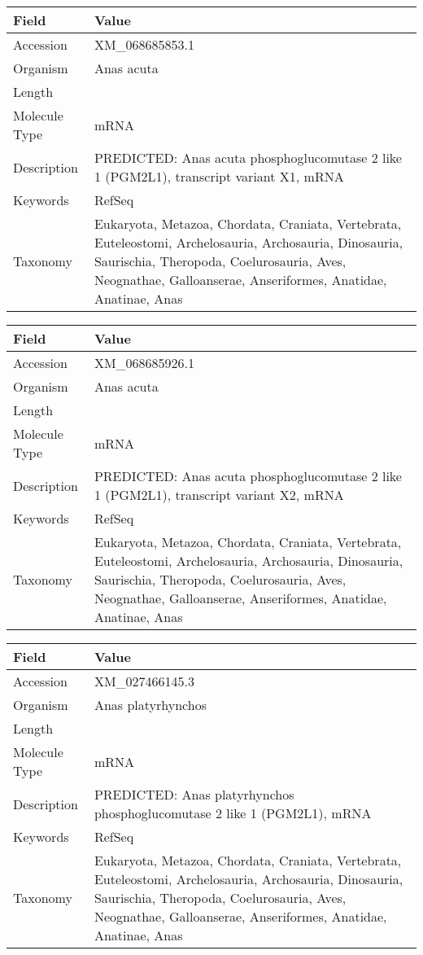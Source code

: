 \documentclass[10pt]{article}
\begin{document}
{\footnotesize
\begin{longtable}{>{\raggedright\arraybackslash}p{4.5cm} >{\raggedright\arraybackslash}p{11.5cm}}
\textbf{Field} & \textbf{Value} \\
\hline
Accession & XM\_068685853.1 \\
Organism & Anas acuta \\
Length & 6369 \\
Molecule Type & mRNA \\
Description & PREDICTED: Anas acuta phosphoglucomutase 2 like 1 (PGM2L1), transcript variant X1, mRNA \\
Keywords & RefSeq \\
Taxonomy & Eukaryota, Metazoa, Chordata, Craniata, Vertebrata, Euteleostomi, Archelosauria, Archosauria, Dinosauria, Saurischia, Theropoda, Coelurosauria, Aves, Neognathae, Galloanserae, Anseriformes, Anatidae, Anatinae, Anas \\
\end{longtable}
}

{\footnotesize
\begin{longtable}{>{\raggedright\arraybackslash}p{4.5cm} >{\raggedright\arraybackslash}p{11.5cm}}
\textbf{Field} & \textbf{Value} \\
\hline
Accession & XM\_068685926.1 \\
Organism & Anas acuta \\
Length & 6180 \\
Molecule Type & mRNA \\
Description & PREDICTED: Anas acuta phosphoglucomutase 2 like 1 (PGM2L1), transcript variant X2, mRNA \\
Keywords & RefSeq \\
Taxonomy & Eukaryota, Metazoa, Chordata, Craniata, Vertebrata, Euteleostomi, Archelosauria, Archosauria, Dinosauria, Saurischia, Theropoda, Coelurosauria, Aves, Neognathae, Galloanserae, Anseriformes, Anatidae, Anatinae, Anas \\
\end{longtable}
}

{\footnotesize
\begin{longtable}{>{\raggedright\arraybackslash}p{4.5cm} >{\raggedright\arraybackslash}p{11.5cm}}
\textbf{Field} & \textbf{Value} \\
\hline
Accession & XM\_027466145.3 \\
Organism & Anas platyrhynchos \\
Length & 6371 \\
Molecule Type & mRNA \\
Description & PREDICTED: Anas platyrhynchos phosphoglucomutase 2 like 1 (PGM2L1), mRNA \\
Keywords & RefSeq \\
Taxonomy & Eukaryota, Metazoa, Chordata, Craniata, Vertebrata, Euteleostomi, Archelosauria, Archosauria, Dinosauria, Saurischia, Theropoda, Coelurosauria, Aves, Neognathae, Galloanserae, Anseriformes, Anatidae, Anatinae, Anas \\
\end{longtable}
}
\end{document}
